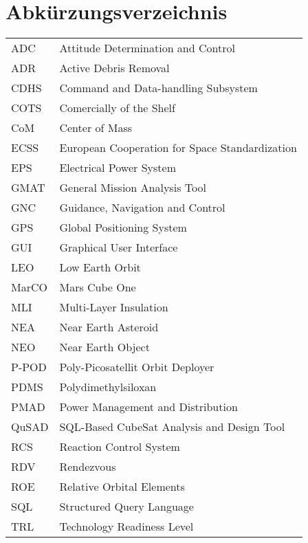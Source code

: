 \chapter*{Abk\"urzungsverzeichnis}
\begin{flushleft}
\begin{table}[th]
\setlength{\tabcolsep}{55pt}
\begin{tabular}{ l l }
ADC & Attitude Determination and Control\\
ADR & Active Debris Removal\\
CDHS & Command and Data-handling Subsystem\\
COTS & Comercially of the Shelf\\
CoM & Center of Mass\\
ECSS & European Cooperation for Space Standardization\\
EPS & Electrical Power System\\
GMAT & General Mission Analysis Tool\\
GNC & Guidance, Navigation and Control\\
GPS & Global Positioning System\\
GUI & Graphical User Interface\\
LEO & Low Earth Orbit\\
MarCO & Mars Cube One\\
MLI & Multi-Layer Insulation\\
NEA & Near Earth Asteroid\\
NEO & Near Earth Object\\
P-POD & Poly-Picosatellit Orbit Deployer\\
PDMS & Polydimethylsiloxan\\
PMAD & Power Management and Distribution\\
QuSAD & SQL-Based CubeSat Analysis and Design Tool\\
RCS & Reaction Control System\\
RDV & Rendezvous\\
ROE & Relative Orbital Elements\\
SQL & Structured Query Language\\
TRL & Technology Readiness Level\\
\end{tabular}
\end{table}
\end{flushleft}
